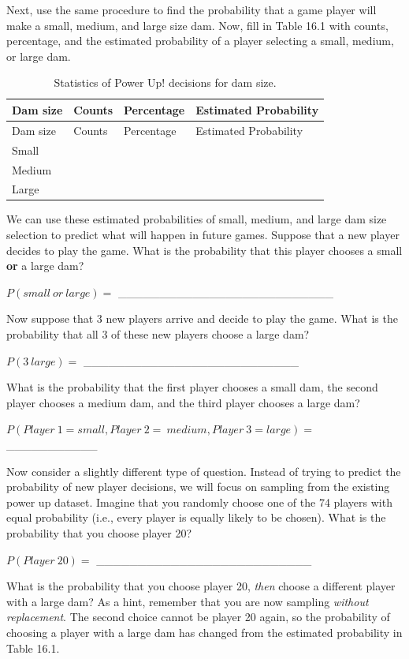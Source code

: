 \documentclass[
]{scrbook}
\begin{document}
Next, use the same procedure to find the probability that a game player will make a small, medium, and large size dam.
Now, fill in Table 16.1 with counts, percentage, and the estimated probability of a player selecting a small, medium, or large dam.

\begin{longtable}[]{@{}llll@{}}
\caption{Statistics of Power Up! decisions for dam size.}\tabularnewline
\toprule
Dam size & Counts & Percentage & Estimated Probability \\
\midrule
\endfirsthead
\toprule
Dam size & Counts & Percentage & Estimated Probability \\
\midrule
\endhead
Small & & & \\
Medium & & & \\
Large & & & \\
\bottomrule
\end{longtable}

We can use these estimated probabilities of small, medium, and large dam size selection to predict what will happen in future games.
Suppose that a new player decides to play the game.
What is the probability that this player chooses a small \textbf{or} a large dam?

\(P(small\:or\:large) =\) \_\_\_\_\_\_\_\_\_\_\_\_\_\_\_\_\_\_\_\_\_\_\_\_\_\_

Now suppose that 3 new players arrive and decide to play the game.
What is the probability that all 3 of these new players choose a large dam?

\(P(3\:large) =\) \_\_\_\_\_\_\_\_\_\_\_\_\_\_\_\_\_\_\_\_\_\_\_\_\_\_

What is the probability that the first player chooses a small dam, the second player chooses a medium dam, and the third player chooses a large dam?

\(P(Player\:1 = small,Player\:2 = \:medium,Player\:3 = large) =\) \_\_\_\_\_\_\_\_\_\_\_

Now consider a slightly different type of question.
Instead of trying to predict the probability of new player decisions, we will focus on sampling from the existing power up dataset.
Imagine that you randomly choose one of the 74 players with equal probability (i.e., every player is equally likely to be chosen).
What is the probability that you choose player 20?

\(P(Player\:20) =\) \_\_\_\_\_\_\_\_\_\_\_\_\_\_\_\_\_\_\_\_\_\_\_\_\_\_

What is the probability that you choose player 20, \emph{then} choose a different player with a large dam?
As a hint, remember that you are now sampling \emph{without replacement}.
The second choice cannot be player 20 again, so the probability of choosing a player with a large dam has changed from the estimated probability in Table 16.1.
\end{document}

